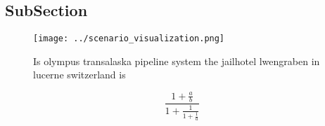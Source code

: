 \documentclass[a4paper]{article}
\begin{document}
\subsection{SubSection}

\begin{figure}
\centering
\texttt{[image: ../scenario\_visualization.png]}
\caption{Is olympus transalaska pipeline system the jailhotel lwengraben in lucerne switzerland is
}
\end{figure}
 
\[ \frac{1+\frac{a}{b}}{1+\frac{1}{1+\frac{1}{a}}} \]
\end{document}
